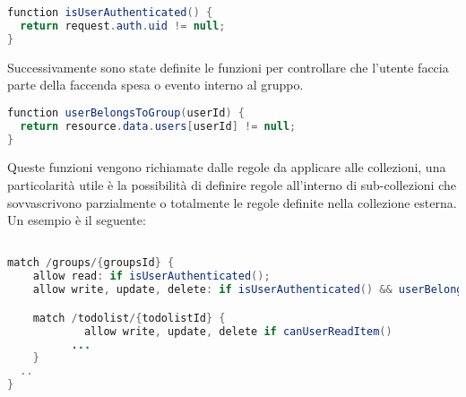 \begin{lstlisting}[language=java,caption={Firestore Rules Controllo autenticazione}]
function isUserAuthenticated() {
  return request.auth.uid != null;
}
\end{lstlisting}

Successivamente sono state definite le funzioni per controllare che l'utente faccia parte della faccenda spesa o evento interno al gruppo.

\begin{lstlisting}[language=java,caption={Firestore Rules Controllo Visibilità}]
function userBelongsToGroup(userId) {
  return resource.data.users[userId] != null;
}
\end{lstlisting}
Queste funzioni vengono richiamate dalle regole da applicare alle collezioni, una particolarità utile è la possibilità di definire regole all'interno di sub-collezioni che sovvascrivono parzialmente o totalmente le regole definite nella collezione esterna.
Un esempio è il seguente:

\begin{lstlisting}[language=java,caption={Firestore Rules Controllo Visibilità}]

match /groups/{groupsId} {
    allow read: if isUserAuthenticated();
    allow write, update, delete: if isUserAuthenticated() && userBelongsToGroup()

    match /todolist/{todolistId} {
      		allow write, update, delete if canUserReadItem()
          ...
    }
  ..
}
\end{lstlisting}
